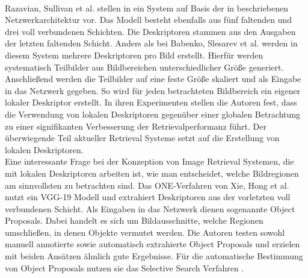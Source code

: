 \\
Razavian, Sullivan et al. stellen in \cite{convnet} ein System auf Basis der in \cite{convnetarc} beschriebenen Netzwerkarchitektur vor. Das Modell besteht ebenfalls aus fünf faltenden und drei voll verbundenen Schichten. Die Deskriptoren stammen aus den Ausgaben der letzten faltenden Schicht.
Anders als bei Babenko, Slesarev et al. werden in diesem System mehrere Deskriptoren pro Bild erstellt. Hierfür werden systematisch Teilbilder aus Bildbereichen unterschiedlicher Größe generiert. Anschließend werden die Teilbilder auf eine feste Größe skaliert und als Eingabe in das Netzwerk gegeben. So wird für jeden betrachteten Bildbereich ein eigener lokaler Deskriptor erstellt. In ihren Experimenten stellen die Autoren fest, dass die Verwendung von lokalen Deskriptoren gegenüber einer globalen Betrachtung zu einer signifikanten Verbesserung der Retrievalperformanz führt. Der überwiegende Teil aktueller Retrieval Systeme setzt auf die Erstellung von lokalen Deskriptoren.
\\
Eine interessante Frage bei der Konzeption von Image Retrieval Systemen, die mit lokalen Deskriptoren arbeiten ist, wie man entscheidet, welche Bildregionen am sinnvollsten zu betrachten sind. Das ONE-Verfahren \cite{one} von Xie, Hong et al. nutzt ein VGG-19 \cite{vgg} Modell und extrahiert Deskriptoren aus der vorletzten voll verbundenen Schicht. Als Eingaben in das Netzwerk dienen sogenannte Object Proposals. Dabei handelt es sich um Bildausschnitte, welche Regionen umschließen, in denen Objekte vermutet werden. Die Autoren testen sowohl manuell annotierte sowie automatisch extrahierte Object Proposals und erzielen mit beiden Ansätzen ähnlich gute Ergebnisse. Für die automatische Bestimmung von Object Proposals nutzen sie das Selective Search Verfahren \cite{selective_search}.
\\
